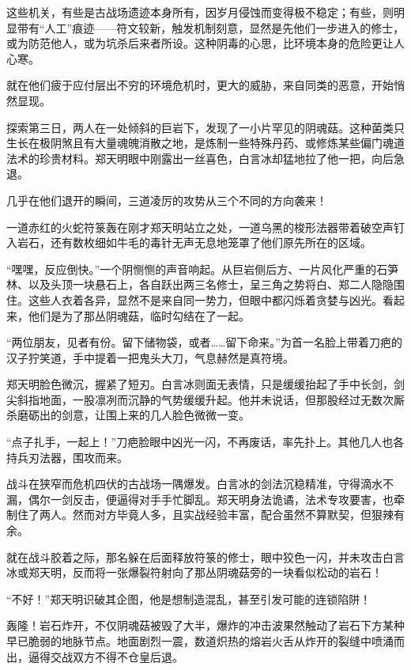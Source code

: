 这些机关，有些是古战场遗迹本身所有，因岁月侵蚀而变得极不稳定；有些，则明显带有“人工”痕迹——符文较新，触发机制刻意，显然是先他们一步进入的修士，或为防范他人，或为坑杀后来者所设。这种阴毒的心思，比环境本身的危险更让人心寒。

\vspace{2em}

就在他们疲于应付层出不穷的环境危机时，更大的威胁，来自同类的恶意，开始悄然显现。

探索第三日，两人在一处倾斜的巨岩下，发现了一小片罕见的阴魂菇。这种菌类只生长在极阴煞且有大量魂魄消散之地，是炼制一些特殊丹药、或修炼某些偏门魂道法术的珍贵材料。郑天明眼中刚露出一丝喜色，白言冰却猛地拉了他一把，向后急退。

几乎在他们退开的瞬间，三道凌厉的攻势从三个不同的方向袭来！

一道赤红的火蛇符箓轰在刚才郑天明站立之处，一道乌黑的梭形法器带着破空声钉入岩石，还有数枚细如牛毛的毒针无声无息地笼罩了他们原先所在的区域。

“嘿嘿，反应倒快。”一个阴恻恻的声音响起。从巨岩侧后方、一片风化严重的石笋林、以及头顶一块悬石上，各自跃出两三名修士，呈三角之势将白、郑二人隐隐围住。这些人衣着各异，显然不是来自同一势力，但眼中都闪烁着贪婪与凶光。看起来，他们是为了那丛阴魂菇，临时勾结在了一起。

“两位朋友，见者有份。留下储物袋，或者……留下命来。”为首一名脸上带着刀疤的汉子狞笑道，手中提着一把鬼头大刀，气息赫然是真符境。

郑天明脸色微沉，握紧了短刃。白言冰则面无表情，只是缓缓抬起了手中长剑，剑尖斜指地面，一股凛冽而沉静的气势缓缓升起。他并未说话，但那股经过无数次厮杀磨砺出的剑意，让围上来的几人脸色微微一变。

“点子扎手，一起上！”刀疤脸眼中凶光一闪，不再废话，率先扑上。其他几人也各持兵刃法器，围攻而来。

战斗在狭窄而危机四伏的古战场一隅爆发。白言冰的剑法沉稳精准，守得滴水不漏，偶尔一剑反击，便逼得对手手忙脚乱。郑天明身法诡谲，法术专攻要害，也牵制住了两人。然而对方毕竟人多，且实战经验丰富，配合虽然不算默契，但狠辣有余。

就在战斗胶着之际，那名躲在后面释放符箓的修士，眼中狡色一闪，并未攻击白言冰或郑天明，反而将一张爆裂符射向了那丛阴魂菇旁的一块看似松动的岩石！

“不好！”郑天明识破其企图，他是想制造混乱，甚至引发可能的连锁陷阱！

轰隆！岩石炸开，不仅阴魂菇被毁了大半，爆炸的冲击波果然触动了岩石下方某种早已脆弱的地脉节点。地面剧烈一震，数道炽热的熔岩火舌从炸开的裂缝中喷涌而出，逼得交战双方不得不仓皇后退。

